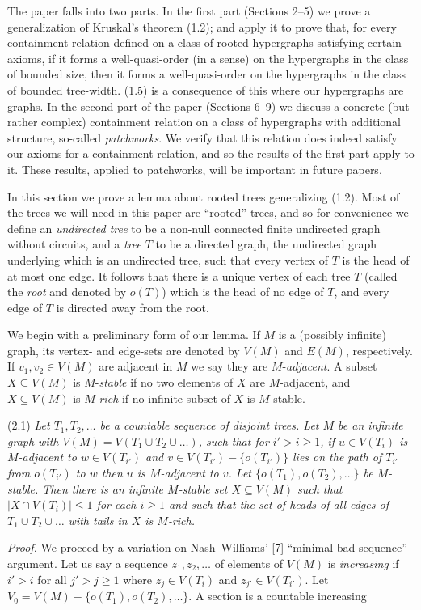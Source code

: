 The paper falls into two parts. In the first part (Sections 2--5) we prove a generalization of Kruskal's theorem (1.2); and apply it to prove that, for every containment relation defined on a class of rooted hypergraphs satisfying certain axioms, if it forms a well-quasi-order (in a sense) on the hypergraphs in the class of bounded size, then it forms a well-quasi-order on the hypergraphs in the class of bounded tree-width. (1.5) is a consequence of this where our hypergraphs are graphs. In the second part of the paper (Sections 6--9) we discuss a concrete (but rather complex) containment relation on a class of hypergraphs with additional structure, so-called \textit{patchworks}. We verify that this relation does indeed satisfy our axioms for a containment relation, and so the results of the first part apply to it. These results, applied to patchworks, will be important in future papers.


In this section we prove a lemma about rooted trees generalizing (1.2). Most of the trees we will need in this paper are ``rooted'' trees, and so for convenience we define an \textit{undirected tree} to be a non-null connected finite undirected graph without circuits, and a \textit{tree} $T$ to be a directed graph, the undirected graph underlying which is an undirected tree, such that every vertex of $T$ is the head of at most one edge. It follows that there is a unique vertex of each tree $T$ (called the \textit{root} and denoted by $o(T)$) which is the head of no edge of $T$, and every edge of $T$ is directed away from the root.

We begin with a preliminary form of our lemma. If $M$ is a (possibly infinite) graph, its vertex- and edge-sets are denoted by $V(M)$ and $E(M)$, respectively. If $v_1, v_2 \in V(M)$ are adjacent in $M$ we say they are $M$-\textit{adjacent}. A subset $X \subseteq V(M)$ is $M$-\textit{stable} if no two elements of $X$ are $M$-adjacent, and $X \subseteq V(M)$ is $M$-\textit{rich} if no infinite subset of $X$ is $M$-stable.

\stmt
(2.1) \textit{Let $T_1, T_2, \dots$ be a countable sequence of disjoint trees. Let $M$ be an infinite graph with $V(M) = V(T_1 \cup T_2 \cup \dots)$, such that for $i' > i \ge 1$, if $u \in V(T_i)$ is $M$-adjacent to $w \in V(T_{i'})$ and $v \in V(T_{i'}) - \{o(T_{i'})\}$ lies on the path of $T_{i'}$ from $o(T_{i'})$ to $w$ then $u$ is $M$-adjacent to $v$. Let $\{o(T_1), o(T_2), \dots\}$ be $M$-stable. Then there is an infinite $M$-stable set $X \subseteq V(M)$ such that $|X \cap V(T_i)| \le 1$ for each $i \ge 1$ and such that the set of heads of all edges of $T_1 \cup T_2 \cup \dots$ with tails in $X$ is $M$-rich.}

\textit{Proof.} We proceed by a variation on Nash--Williams' [7] ``minimal bad sequence'' argument. Let us say a sequence $z_1, z_2, \dots$ of elements of $V(M)$ is \textit{increasing} if $i' > i$ for all $j' > j \ge 1$ where $z_j \in V(T_i)$ and $z_{j'} \in V(T_{i'})$. Let $V_0 = V(M) - \{o(T_1), o(T_2), \dots\}$. A section is a countable increasing
